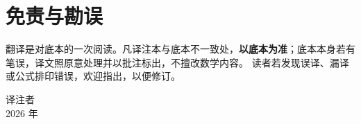 \section*{免责与勘误}

翻译是对底本的一次阅读。凡译注本与底本不一致处，\textbf{以底本为准}；底本本身若有笔误，译文照原意处理并以批注标出，不擅改数学内容。
读者若发现误译、漏译或公式排印错误，欢迎指出，以便修订。

\vspace{1.2em}
\begin{flushright}
译注者\\
2026 年
\end{flushright}
